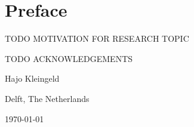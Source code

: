 \chapter*{Preface}
TODO MOTIVATION FOR RESEARCH TOPIC

\vspace{1\baselineskip}

\noindent
TODO ACKNOWLEDGEMENTS

\vspace{1\baselineskip}

\noindent
Hajo Kleingeld

\vspace{1\baselineskip}

\noindent
Delft, The Netherlands

\noindent
\today
